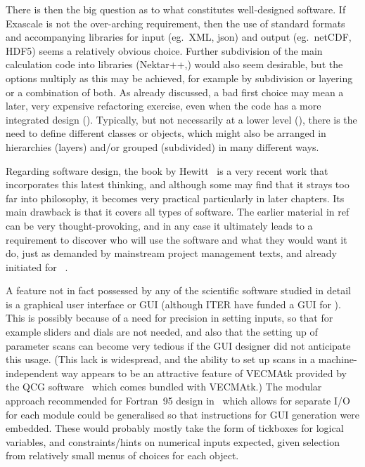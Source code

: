 There is then the big question as to what constitutes well-designed software. 
If Exascale is not the over-arching requirement, then the use of standard formats
and accompanying libraries for input (eg.\ XML, json)
and output (eg.\ netCDF, HDF5) seems a relatively obvious choice. Further
subdivision of the main calculation code into libraries (Nektar++,)
would also seem desirable,
but the options multiply as this may be achieved, for example by subdivision or
layering or a combination of both. As already discussed, a bad first choice may
mean a later, very expensive refactoring exercise, even when the code has
a more integrated design ().  Typically, but not necessarily at
a lower level (), there is the need to define different classes or objects,
which might also be arranged in hierarchies (layers) and/or grouped (subdivided) in
many different ways.

Regarding software design, the book by Hewitt~\cite{hewitt} is a very recent work
that incorporates this latest thinking, and although some may find that it strays too
far into philosophy, it becomes very practical particularly in later chapters.
Its main drawback is that it covers all types of software.
The earlier material in ref~\cite{hewitt} can be very thought-provoking, and
in any case it ultimately leads to a requirement to discover who will use
the software and what they would want it do, just as demanded by mainstream project
management texts, and already initiated for \nep~\cite{y1re111a,y1re111b}.

A feature not in fact possessed by any of the scientific software studied
in detail is a graphical
user interface or GUI (although ITER have funded a GUI for ). This is possibly
because of a need for precision in setting inputs, so that for example sliders
and dials are not needed, and also that the setting up of parameter scans can become
very tedious if the GUI designer did not anticipate this usage. (This
lack is widespread, and the ability to set up scans in a machine-independent
way appears to be an attractive feature of VECMAtk provided by the QCG software~\cite{qcgwebsite}
which comes bundled with VECMAtk.) The modular
approach recommended for Fortran~95 design in~\cite{fprog} which allows for
separate I/O for each module could be generalised so that instructions for GUI
generation were embedded. These would probably mostly take the form of tickboxes
for logical variables, and constraints/hints on numerical inputs expected,
given selection from relatively small menus of choices for each object.




